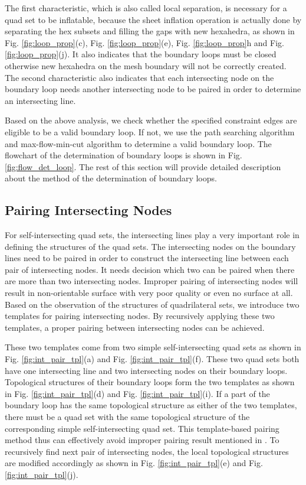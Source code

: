 \documentclass[final,5p,times,twocolumn]{elsarticle}
\begin{document}
The first characteristic, which is also called local separation, is necessary for a quad set to be inflatable, because the sheet inflation operation is actually done by separating the hex subsets and filling the gaps with new hexahedra, as shown in Fig. \ref{fig:loop_prop}(c), Fig. \ref{fig:loop_prop}(e), Fig. \ref{fig:loop_prop}h and Fig. \ref{fig:loop_prop}(j). It also indicates that the boundary loops must be closed otherwise new hexahedra on the mesh boundary will not be correctly created. The second characteristic also indicates that each intersecting node on the boundary loop needs another intersecting node to be paired in order to determine an intersecting line.

Based on the above analysis, we check whether the specified constraint edges are eligible to be a valid boundary loop. If not, we use the path searching algorithm and max-flow-min-cut algorithm to determine a valid boundary loop. The flowchart of the determination of boundary loops is shown in Fig. \ref{fig:flow_det_loop}. The rest of this section will provide detailed description about the method of the determination of boundary loops.

\subsection{Pairing Intersecting Nodes}
\label{sec:int_pt_pair}
For self-intersecting quad sets, the intersecting lines play a very important role in defining the structures of the quad sets. The intersecting nodes on the boundary lines need to be paired in order to construct the intersecting line between each pair of intersecting nodes. It needs decision which two can be paired when there are more than two intersecting nodes. Improper pairing of intersecting nodes will result in non-orientable surface with very poor quality or even no surface at all\cite{Suzuki:2010hn}. Based on the observation of the structures of quadrilateral sets, we introduce two templates for pairing intersecting nodes. By recursively applying these two templates, a proper pairing between intersecting nodes can be achieved. 

These two templates come from two simple self-intersecting quad sets as shown in Fig. \ref{fig:int_pair_tpl}(a) and Fig. \ref{fig:int_pair_tpl}(f). These two quad sets both have one intersecting line and two intersecting nodes on their boundary loops. Topological structures of their boundary loops form the two templates as shown in Fig. \ref{fig:int_pair_tpl}(d) and Fig. \ref{fig:int_pair_tpl}(i). If a part of the boundary loop has the same topological structure as either of the two templates, there must be a quad set with the same topological structure of the corresponding simple self-intersecting quad set. This template-based pairing method thus can effectively avoid improper pairing result mentioned in \cite{Suzuki:2010hn}. To recursively find next pair of intersecting nodes, the local topological structures are modified accordingly as shown in Fig. \ref{fig:int_pair_tpl}(e) and Fig. \ref{fig:int_pair_tpl}(j).
\end{document}
